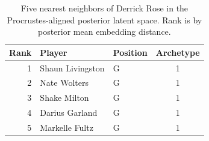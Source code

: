 \begin{table}[htbp]
  \centering\small
  \begin{tabular}{rllc}
    \toprule
    Rank & Player & Position & Archetype \\
    \midrule
    1 & Shaun Livingston & G & 1 \\
    2 & Nate Wolters & G & 1 \\
    3 & Shake Milton & G & 1 \\
    4 & Darius Garland & G & 1 \\
    5 & Markelle Fultz & G & 1 \\
    \bottomrule
  \end{tabular}
  \caption{Five nearest neighbors of Derrick Rose in the Procrustes-aligned posterior latent space. Rank is by posterior mean embedding distance.}
  \label{tab:Derrick_Rose_neighbors}
\end{table}

